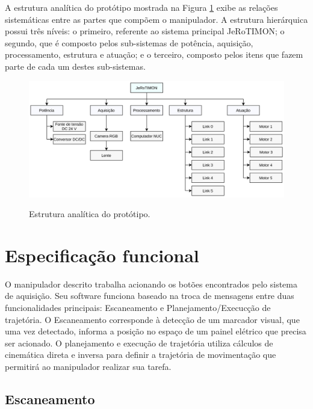A estrutura analítica do protótipo mostrada na Figura \ref{fig:estrutura_analitica} exibe as relações sistemáticas entre as partes que compõem o manipulador. A estrutura hierárquica possui três níveis: o primeiro, referente ao sistema principal JeRoTIMON; o segundo, que é composto pelos sub-sistemas de potência, aquisição, processamento, estrutura e atuação; e o terceiro, composto pelos itens que fazem parte de cada um destes sub-sistemas. 

\begin{figure}[H]
  \caption{Estrutura analítica do protótipo.}
  \centering
  \includegraphics[width=16 cm]{images/estrutura_analitica.jpg}
  \label{fig:estrutura_analitica}
\end{figure}


\section{Especificação funcional} %
\label{sec:sota}
O manipulador descrito trabalha acionando os botões encontrados pelo sistema de aquisição. Seu software funciona baseado na troca de mensagens entre duas funcionalidades principais: Escaneamento e Planejamento/Execucção de trajetória. O Escaneamento corresponde à detecção de um marcador visual, que uma vez detectado, informa a posição no espaço de um painel elétrico que precisa ser acionado. O planejamento e execução de trajetória utiliza cálculos de cinemática direta e inversa para definir a trajetória de movimentação que permitirá ao manipulador realizar sua tarefa.


\subsection{Escaneamento}
\label{sub:funcA}

